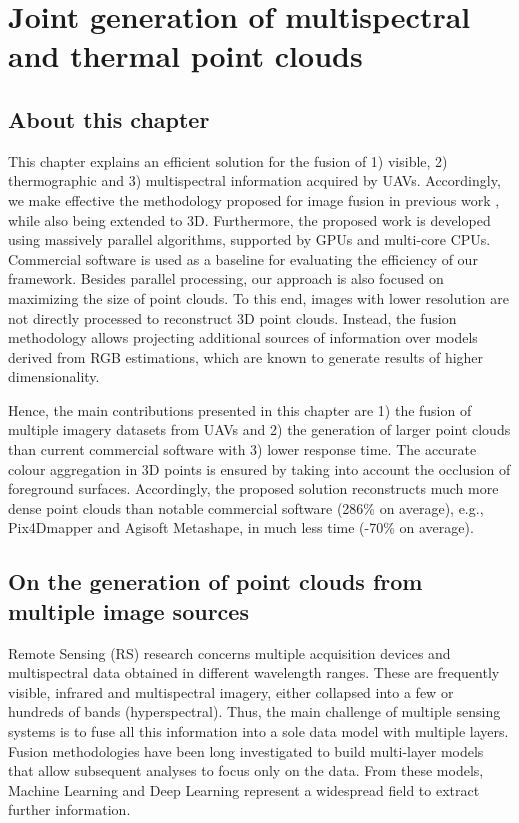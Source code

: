 \setchapterpreamble[u]{\margintoc}
\chapter{Joint generation of multispectral and thermal point clouds}
\label{sec:multispectral_pc}

\section*{About this chapter}

This chapter explains an efficient solution for the fusion of 1) visible, 2) thermographic and 3) multispectral information acquired by UAVs. Accordingly, we make effective the methodology proposed for image fusion in previous work \cite{lopez_framework_2021}, while also being extended to 3D. Furthermore, the proposed work is developed using massively parallel algorithms, supported by GPUs and multi-core CPUs. Commercial software is used as a baseline for evaluating the efficiency of our framework. Besides parallel processing, our approach is also focused on maximizing the size of point clouds. To this end, images with lower resolution are not directly processed to reconstruct 3D point clouds. Instead, the fusion methodology allows projecting additional sources of information over models derived from RGB estimations, which are known to generate results of higher dimensionality. 

Hence, the main contributions presented in this chapter are 1) the fusion of multiple imagery datasets from UAVs and 2) the generation of larger point clouds than current commercial software with 3) lower response time. The accurate colour aggregation in 3D points is ensured by taking into account the occlusion of foreground surfaces. Accordingly, the proposed solution reconstructs much more dense point clouds than notable commercial software (286\% on average), e.g., Pix4Dmapper and Agisoft Metashape, in much less time (-70\% on average). 

\section{On the generation of point clouds from multiple image sources}

Remote Sensing (RS) research concerns multiple acquisition devices and multispectral data obtained in different wavelength ranges. These are frequently visible, infrared and multispectral imagery, either collapsed into a few or hundreds of bands (hyperspectral). Thus, the main challenge of multiple sensing systems is to fuse all this information into a sole data model with multiple layers. Fusion methodologies have been long investigated to build multi-layer models that allow subsequent analyses to focus only on the data. From these models, Machine Learning \cite{padua_vineyard_2022} and Deep Learning \cite{jia_survey_2021, hu_hyperspectral_2022} represent a widespread field to extract further information. 

